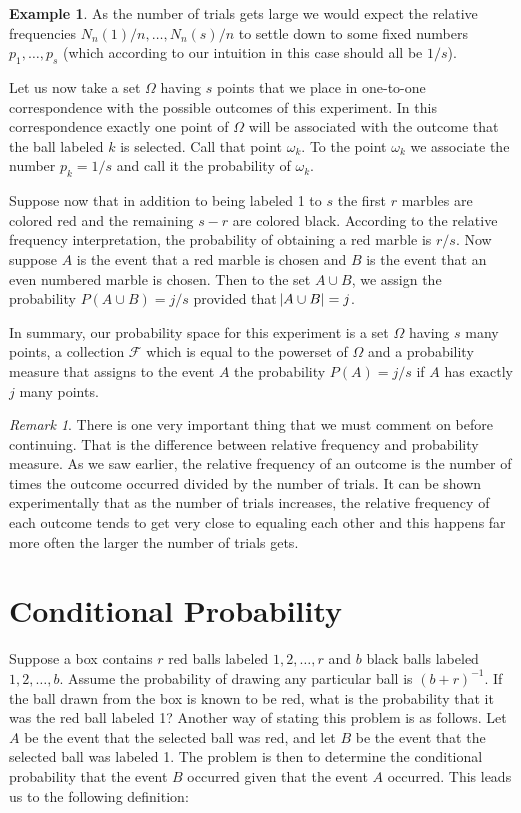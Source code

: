 \documentclass{article}
\theoremstyle{definition}
\theoremstyle{remark}
\newtheorem*{remark}{Remark}
\theoremstyle{definition}
\newtheorem{example}{Example}[section]
\begin{document}
\begin{example}
    As the number of trials gets large we would expect the relative frequencies $N_{n}(1)/n, \dots, N_{n}(s)/n$ to settle down to some fixed numbers $p_1,\dots,p_s$ (which according to our intuition in this case should all be $1/s$).\par Let us now take a set $\Omega$ having $s$ points that we place in one-to-one correspondence with the possible outcomes of this experiment. In this correspondence exactly one point of $\Omega$ will be associated with the outcome that the ball labeled $k$ is selected. Call that point $\omega_k$. To the point $\omega_k$ we associate the number $p_k=1/s$ and call it the probability of $\omega_k$.\par Suppose now that in addition to being labeled 1 to $s$ the first $r$ marbles are colored red and the remaining $s-r$ are colored black. According to the relative frequency interpretation, the probability of obtaining a red marble is $r/s$. Now suppose $A$ is the event that a red marble is chosen and $B$ is the event that an even numbered marble is chosen. Then to the set $A\cup B$, we assign the probability $P(A\cup B)=j/s$ provided that $\abs{A\cup B}=j$. \par In summary, our probability space for this experiment is a set $\Omega$ having $s$ many points, a collection $\mathcal{F}$ which is equal to the powerset of $\Omega$ and a probability measure that assigns to the event $A$ the probability $P(A)=j/s$ if $A$ has exactly $j$ many points.
\end{example}

\begin{remark}
    There is one very important thing that we must comment on before continuing. That is the difference between relative frequency and probability measure. As we saw earlier, the relative frequency of an outcome is the number of times the outcome occurred divided by the number of trials. It can be shown experimentally that as the number of trials increases, the relative frequency of each outcome tends to get very close to equaling each other and this happens far more often the larger the number of trials gets. 
\end{remark}

\section{Conditional Probability}

Suppose a box contains $r$ red balls labeled $1, 2, \dots, r$ and $b$ black balls labeled $1, 2, \dots, b$. Assume the probability of drawing any particular ball is $(b+r)^{-1}$. If the ball drawn from the box is known to be red, what is the probability that it was the red ball labeled 1? Another way of stating this problem is as follows. Let $A$ be the event that the selected ball was red, and let $B$ be the event that the selected ball was labeled 1. The problem is then to determine the conditional probability that the event $B$ occurred given that the event $A$ occurred. This leads us to the following definition:
\end{document}
